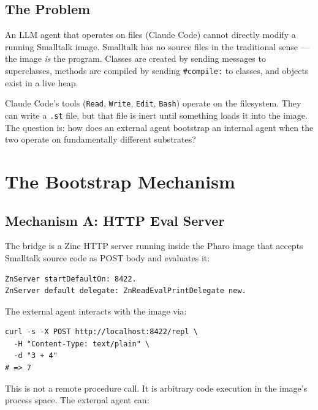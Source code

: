 \documentclass[a4paper,10pt,fleqn]{article}
\newcommand{\sel}[1]{\texttt{\##1}}
\begin{document}
\subsection{The Problem}

An LLM agent that operates on files (Claude Code) cannot directly
modify a running Smalltalk image.  Smalltalk has no source files in the
traditional sense --- the image \emph{is} the program.  Classes are
created by sending messages to superclasses, methods are compiled by
sending \sel{compile:} to classes, and objects exist in a live heap.

Claude Code's tools (\texttt{Read}, \texttt{Write}, \texttt{Edit},
\texttt{Bash}) operate on the filesystem.  They can write a \texttt{.st}
file, but that file is inert until something loads it into the image.
The question is: how does an external agent bootstrap an internal agent
when the two operate on fundamentally different substrates?

\section{The Bootstrap Mechanism}

\subsection{Mechanism A: HTTP Eval Server}

The bridge is a Zinc HTTP server running inside the Pharo image that
accepts Smalltalk source code as POST body and evaluates it:

\begin{lstlisting}[language={},title={The minimal bridge (2 lines)}]
ZnServer startDefaultOn: 8422.
ZnServer default delegate: ZnReadEvalPrintDelegate new.
\end{lstlisting}

The external agent interacts with the image via:

\begin{lstlisting}[language={},title={External agent sends Smalltalk}]
curl -s -X POST http://localhost:8422/repl \
  -H "Content-Type: text/plain" \
  -d "3 + 4"
# => 7
\end{lstlisting}

This is not a remote procedure call.  It is arbitrary code execution
in the image's process space.  The external agent can:
\end{document}
